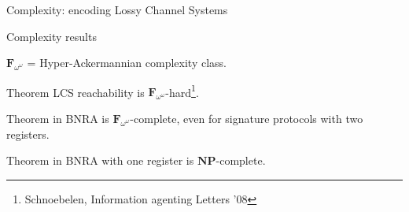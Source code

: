 \documentclass{beamer}
\begin{document}
\begin{frame}{Complexity: encoding Lossy Channel Systems}
	
	
	
\end{frame}

\begin{frame}{Complexity results}
	
	$\mathbf{F}_{\omega^\omega}$ = Hyper-Ackermannian complexity class.
	
	\begin{block}{Theorem}
		LCS reachability is $\mathbf{F}_{\omega^\omega}$-hard\footnote{Schnoebelen, Information agenting Letters '08}.
	\end{block}
	\pause 

	\begin{block}{Theorem}
		{} in BNRA is $\mathbf{F}_{\omega^\omega}$-complete, even for signature protocols with two registers.
	\end{block}
	\pause 

	\begin{block}{Theorem}
		 {} in BNRA with one register is $\mathbf{NP}$-complete.
	\end{block}
	
\end{frame}
\end{document}
